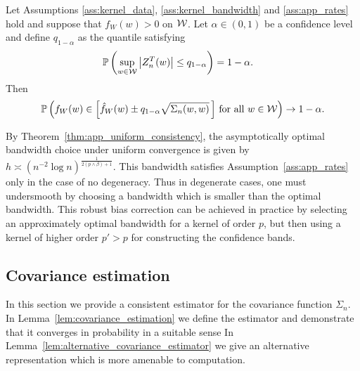 \begin{theorem}
  \label{thm:app_infeasible_ucb}

  Let Assumptions \ref{ass:kernel_data}, \ref{ass:kernel_bandwidth}
  and \ref{ass:app_rates}
  hold and suppose that $f_W(w) > 0$ on $\mathcal{W}$.
  Let $\alpha \in (0,1)$ be a confidence level
  and define $q_{1-\alpha}$ as the quantile
  satisfying
  \begin{align*}
    \mathbb{P}\left(
      \sup_{w \in \mathcal{W}}
      \left| Z_n^T(w) \right|
      \leq q_{1-\alpha}
    \right)
    &=
    1 - \alpha.
  \end{align*}
  Then
  \begin{align*}
    \mathbb{P}\left(
      f_W(w)
      \in
      \left[
        \hat f_W(w)
        \pm
        q_{1-\alpha}
        \sqrt{\Sigma_n(w,w)}
        \, \right]
      \, \textup{for all }
      w \in \mathcal{W}
    \right)
    \to 1 - \alpha.
  \end{align*}
\end{theorem}

\begin{remark}

  By Theorem~\ref{thm:app_uniform_consistency},
  the asymptotically optimal bandwidth choice
  under uniform convergence is given by
  $h \asymp (n^{-2} \log n)^{\frac{1}{2(p \wedge \beta)+1}}$.
  This bandwidth satisfies Assumption~\ref{ass:app_rates}
  only in the case of no degeneracy.
  Thus in degenerate cases, one must undersmooth by choosing
  a bandwidth which is smaller than the optimal bandwidth.
  This robust bias correction can be achieved in practice by selecting an
  approximately optimal bandwidth
  for a kernel of order $p$, but then using a kernel of higher order
  $p' > p$ for constructing the confidence bands.

\end{remark}

\subsection{Covariance estimation}

In this section
we provide a consistent estimator for the
covariance function $\Sigma_n$.
In Lemma~\ref{lem:covariance_estimation}
we define the estimator and demonstrate that it
converges in probability in a suitable sense
In Lemma~\ref{lem:alternative_covariance_estimator}
we give an alternative representation
which is more amenable to computation.

